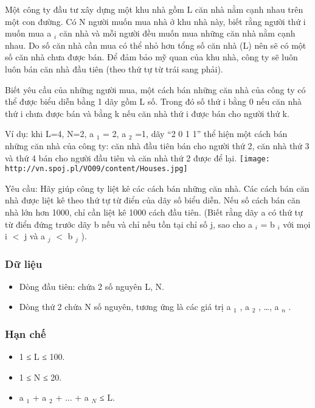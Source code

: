 



        Một công ty đầu tư xây dựng một khu nhà gồm L căn nhà nằm cạnh nhau trên một con đường. Có N người muốn mua nhà ở khu nhà này, biết rằng người thứ i muốn mua a        $_         i        $        căn nhà và mỗi người đều muốn mua những căn nhà nằm cạnh nhau. Do số căn nhà cần mua có thể nhỏ hơn tổng số căn nhà (L) nên sẽ có một số căn nhà chưa được bán. Để đảm bảo mỹ quan của khu nhà, công ty sẽ luôn luôn bán căn nhà đầu tiên (theo thứ tự từ trái sang phải).       

        Biết yêu cầu của những người mua, một cách bán những căn nhà của công ty có thể được biểu diễn bằng 1 dãy gồm L số. Trong đó số thứ i bằng 0 nếu căn nhà thứ i chưa được bán và bằng k nếu căn nhà thứ i được bán cho người thứ k.       

        Ví dụ: khi L=4, N=2, a        $_         1        $        = 2, a        $_         2        $        =1, dãy “2 0 1 1” thể hiện một cách bán những căn nhà của công ty: căn nhà đầu tiên bán cho người thứ 2, căn nhà thứ 3 và thứ 4 bán cho người đầu tiên và căn nhà thứ 2 được để lại.       
\texttt{[image: http://vn.spoj.pl/VO09/content/Houses.jpg]}



   Yêu cầu: Hãy giúp công ty liệt kê các cách bán những căn nhà. Các cách bán căn nhà được liệt kê theo thứ tự từ điển của dãy số biểu diễn. Nếu số cách bán căn nhà lớn hơn 1000, chỉ cần liệt kê 1000 cách đầu tiên. (Biết rằng dãy a có thứ tự từ điển đứng trước dãy b nếu và chỉ nếu tồn tại chỉ số j, sao cho a   $_    i   $   = b   $_    i   $   với mọi i $<$ j và a   $_    j   $   $<$ b   $_    j   $   ).  

\subsubsection{   Dữ liệu  }
\begin{itemize}
	\item     Dòng đầu tiên: chứa 2 số nguyên L, N.   
	\item     Dòng thứ 2 chứa N số nguyên, tương ứng là các giá trị a    $_     1    $    , a    $_     2    $    , …, a    $_     n    $    .   
\end{itemize}

\subsubsection{   Hạn chế  }
\begin{itemize}
	\item     1 ≤ L ≤ 100.   
	\item     1 ≤ N ≤ 20.   
	\item     a    $_     1    $    + a    $_     2    $    + ... + a    $_     N    $    ≤ L.   
\end{itemize}


